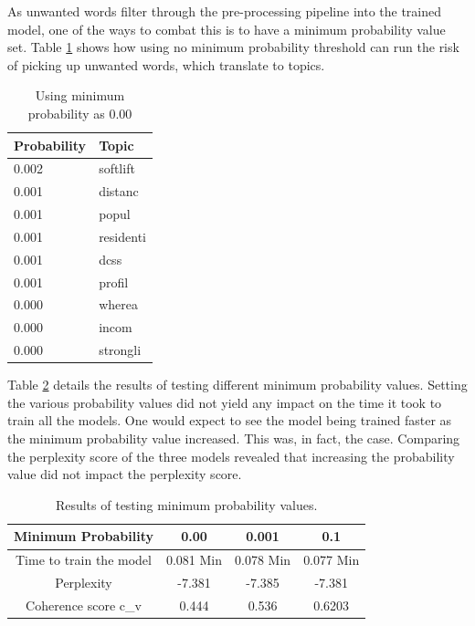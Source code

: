 As unwanted words filter through the pre-processing pipeline into the trained model, one of the ways to combat this is to have a minimum probability value set. Table \ref{tab:minimum} shows how using no minimum probability threshold can run the risk of picking up unwanted words, which translate to topics.

\begin{table}[]
\centering
\begin{tabular}{|l|l|}
\hline
\textbf{Probability} & \textbf{Topic} \\ \hline
0.002 & softlift \\ \hline
0.001 & distanc \\ \hline
0.001 & popul \\ \hline
0.001 & residenti \\ \hline
0.001 & dcss \\ \hline
0.001 & profil \\ \hline
0.000 & wherea \\ \hline
0.000 & incom \\ \hline
0.000 & strongli \\ \hline
\end{tabular}
\caption{Using minimum probability as 0.00}
\label{tab:minimum}
\end{table}

Table \ref{tab:prob} details the results of testing different minimum probability values. Setting the various probability values did not yield any impact on the time it took to train all the models. One would expect to see the model being trained faster as the minimum probability value increased. This was, in fact, the case. Comparing the perplexity score of the three models revealed that increasing the probability value did not impact the perplexity score.

\begin{table}[]
\centering
\begin{tabular}{|c|c|c|c|}
\hline
\multicolumn{1}{|l|}{Minimum Probability} & 0.00 & 0.001 & 0.1 \\ \hline
Time to train the model & 0.081 Min & 0.078 Min & 0.077 Min \\ \hline
Perplexity & -7.381 & -7.385 & -7.381 \\ \hline
Coherence score c\_v & 0.444 & 0.536 & 0.6203 \\ \hline
\end{tabular}
\caption{Results of testing minimum probability values.}
\label{tab:prob}
\end{table}

